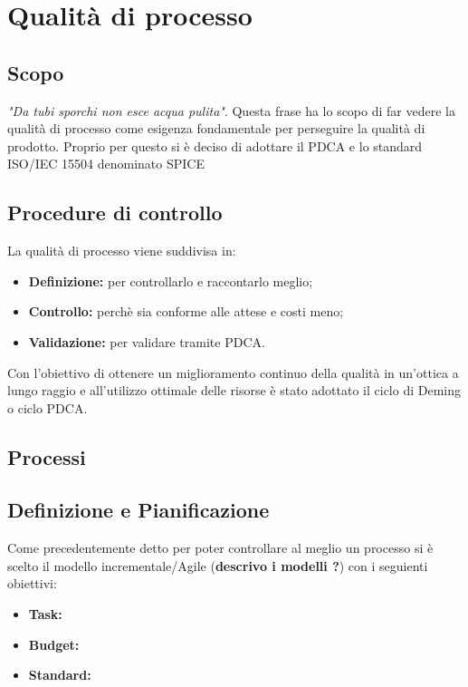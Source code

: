 \section{Qualità di processo}
\subsection{Scopo}
\textit{"Da tubi sporchi non esce acqua pulita"}.
\newline
Questa frase ha lo scopo di far vedere la qualità di processo come esigenza fondamentale per perseguire la qualità di prodotto. Proprio per questo si è deciso di adottare il PDCA e lo standard ISO/IEC 15504 denominato SPICE
\subsection{Procedure di controllo}
La qualità di processo viene suddivisa in:

\begin{itemize}
	\item{\textbf{Definizione:} per controllarlo e raccontarlo meglio};
	\item{\textbf{Controllo:} perchè sia conforme alle attese e costi meno};
	\item{\textbf{Validazione:}  per validare tramite PDCA.}
\end{itemize}
Con l'obiettivo di ottenere un miglioramento continuo della qualità in un'ottica a lungo raggio e all'utilizzo ottimale delle risorse è stato adottato il ciclo di Deming o ciclo PDCA.
\subsection{Processi}
\subsection{Definizione e Pianificazione}
Come precedentemente detto per poter controllare al meglio un processo si è scelto il modello incrementale/Agile (\textbf{descrivo i modelli ?}) con i seguienti obiettivi:
\begin{itemize}
		\item{\textbf{Task:}}
		\item{\textbf{Budget:}}
		\item{\textbf{Standard:}}
\end{itemize} 